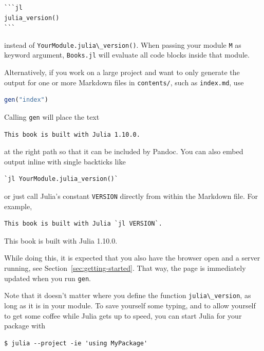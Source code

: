 \documentclass[
  notoc %
]{tufte-book}
\newcommand{\passthrough}[1]{#1}
\begin{document}
\begin{lstlisting}
```jl
julia_version()
```
\end{lstlisting}

instead of \passthrough{\lstinline!YourModule.julia\_version()!}. When
passing your module \passthrough{\lstinline!M!} as keyword argument,
\passthrough{\lstinline!Books.jl!} will evaluate all code blocks inside
that module.

Alternatively, if you work on a large project and want to only generate
the output for one or more Markdown files in
\passthrough{\lstinline!contents/!}, such as
\passthrough{\lstinline!index.md!}, use

\begin{lstlisting}[language=Julia]
gen("index")
\end{lstlisting}

Calling \passthrough{\lstinline!gen!} will place the text

\begin{lstlisting}[language=Output]
This book is built with Julia 1.10.0.
\end{lstlisting}

at the right path so that it can be included by Pandoc. You can also
embed output inline with single backticks like

\begin{lstlisting}
`jl YourModule.julia_version()`
\end{lstlisting}

or just call Julia's constant \passthrough{\lstinline!VERSION!} directly
from within the Markdown file. For example,

\begin{lstlisting}
This book is built with Julia `jl VERSION`.
\end{lstlisting}

This book is built with Julia 1.10.0.

While doing this, it is expected that you also have the browser open and
a server running, see Section~\ref{sec:getting-started}. That way, the
page is immediately updated when you run \passthrough{\lstinline!gen!}.

Note that it doesn't matter where you define the function
\passthrough{\lstinline!julia\_version!}, as long as it is in your
module. To save yourself some typing, and to allow yourself to get some
coffee while Julia gets up to speed, you can start Julia for your
package with

\begin{lstlisting}
$ julia --project -ie 'using MyPackage'
\end{lstlisting}
\end{document}
